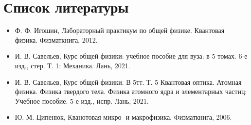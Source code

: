 \documentclass[a4paper, 12pt]{article}
\begin{document}
\section{Список литературы}
\begin{itemize}
\item Ф. Ф. Игошин, Лабораторный практикум по общей физике. Квантовая физика. Физматкнига, 2012.
\item И. В. Савельев, Курс общей физики: учебное пособие для вуза: в 5 томах. 6-е изд., стер. Т. 1: Механика. Лань, 2021.
\item И. В. Савельев, Курс общей физики. В 5тт. Т. 5 Квантовая оптика. Атомная физика. Физика твердого тела. Физика атомного ядра и элементарных частиц: Учебное пособие. 5-е изд., испр. Лань, 2021.
\item Ю. М. Ципенюк, Кванотовая микро- и макрофизика. Физматкнига, 2006.
\end{itemize}
\end{document}
